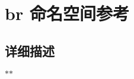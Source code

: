 \hypertarget{namespacebr}{}\section{br 命名空间参考}
\label{namespacebr}


\subsection{详细描述}
\begin{quote}


\end{quote}
$\ast$$\ast$ 